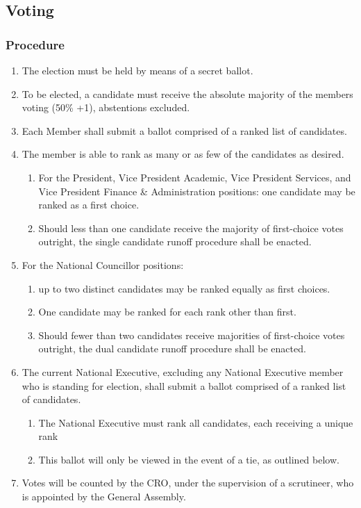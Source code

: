 \subsection{Voting}
\label{voting}

\subsubsection{Procedure}
\label{procedure}

\begin{enumerate}
 \item
  The election must be held by means of a secret ballot.
 \item
  To be elected, a candidate must receive the absolute majority of the members voting (50\% +1), abstentions excluded.
 \item
  Each Member shall submit a ballot comprised of a ranked list of candidates.
 \item
  The member is able to rank as many or as few of the candidates as desired.

  \begin{enumerate}
   \item
    For the President, Vice President Academic, Vice President Services, and Vice President Finance \& Administration positions: one candidate may be ranked as a first choice.
   \item
    Should less than one candidate receive the majority of first-choice votes outright, the single candidate runoff procedure shall be enacted.
  \end{enumerate}

 \item
  For the National Councillor positions:

  \begin{enumerate}
   \item
    up to two distinct candidates may be ranked equally as first choices.
   \item
    One candidate may be ranked for each rank other than first.
   \item
    Should fewer than two candidates receive majorities of first-choice votes outright, the dual candidate runoff procedure shall be enacted.
  \end{enumerate}

 \item
  The current National Executive, excluding any National Executive member who is standing for election, shall submit a ballot comprised of a ranked list of candidates.

  \begin{enumerate}
   \item
    The National Executive must rank all candidates, each receiving a unique rank
   \item
    This ballot will only be viewed in the event of a tie, as outlined below.
  \end{enumerate}

 \item
  Votes will be counted by the CRO, under the supervision of a scrutineer, who is appointed by the General Assembly.
\end{enumerate}


